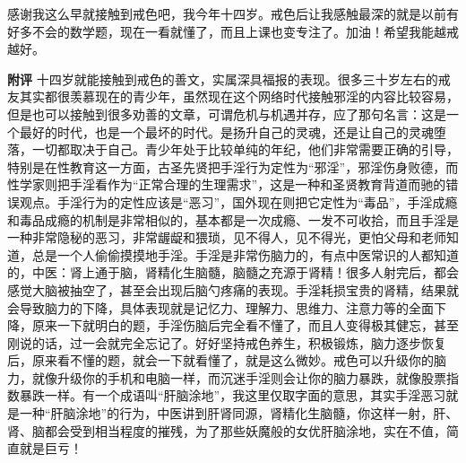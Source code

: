 \begin{case}
    感谢我这么早就接触到戒色吧，我今年十四岁。戒色后让我感触最深的就是以前有好多不会的数学题，现在一看就懂了，而且上课也变专注了。加油！希望我能越戒越好。

    \textbf{附评} 十四岁就能接触到戒色的善文，实属深具福报的表现。很多三十岁左右的戒友其实都很羡慕现在的青少年，虽然现在这个网络时代接触邪淫的内容比较容易，但是也可以接触到很多劝善的文章，可谓危机与机遇并存，应了那句名言：这是一个最好的时代，也是一个最坏的时代。是扬升自己的灵魂，还是让自己的灵魂堕落，一切都取决于自己。青少年处于比较单纯的年纪，他们非常需要正确的引导，特别是在性教育这一方面，古圣先贤把手淫行为定性为“邪淫”，邪淫伤身败德，而性学家则把手淫看作为“正常合理的生理需求”，这是一种和圣贤教育背道而驰的错误观点。手淫行为的定性应该是“恶习”，国外现在则把它定性为“毒品”，手淫成瘾和毒品成瘾的机制是非常相似的，基本都是一次成瘾、一发不可收拾，而且手淫是一种非常隐秘的恶习，非常龌龊和猥琐，见不得人，见不得光，更怕父母和老师知道，总是一个人偷偷摸摸地手淫。手淫是非常伤脑力的，有点中医常识的人都知道的，中医：肾上通于脑，肾精化生脑髓，脑髓之充源于肾精！很多人射完后，都会感觉大脑被抽空了，甚至会出现后脑勺疼痛的表现。手淫耗损宝贵的肾精，结果就会导致脑力的下降，具体表现就是记忆力、理解力、思维力、注意力等的全面下降，原来一下就明白的题，手淫伤脑后完全看不懂了，而且人变得极其健忘，甚至刚说的话，过一会就完全忘记了。好好坚持戒色养生，积极锻炼，脑力逐步恢复后，原来看不懂的题，就会一下就看懂了，就是这么微妙。戒色可以升级你的脑力，就像升级你的手机和电脑一样，而沉迷手淫则会让你的脑力暴跌，就像股票指数暴跌一样。有一个成语叫“肝脑涂地”，我这里仅取字面的意思，其实手淫恶习就是一种“肝脑涂地”的行为，中医讲到肝肾同源，肾精化生脑髓，你这样一射，肝、肾、脑都会受到相当程度的摧残，为了那些妖魔般的女优肝脑涂地，实在不值，简直就是巨亏！
\end{case}

